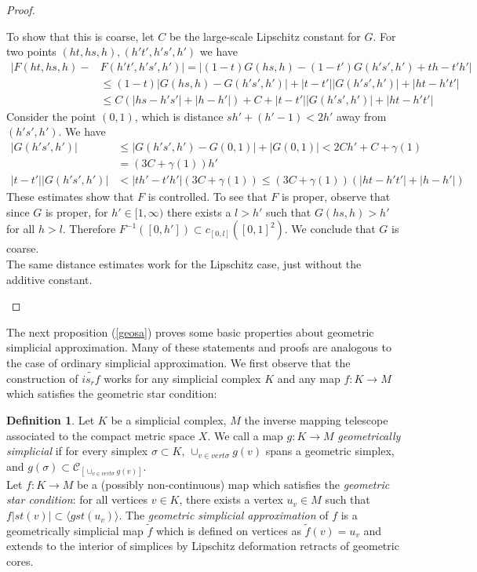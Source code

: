 \documentclass[a4paper,11pt]{article}
\theoremstyle{definition}
\newtheorem{definition}{Definition}[section]
\theoremstyle{plain}
\theoremstyle{remark}
\begin{document}
{\begin{proof}
\begin{enumerate}
To show that this is coarse, let $C$ be the large-scale Lipschitz constant for $G$. For two points $(ht,hs,h), (h't',h's',h')$ we have
\begin{align*}
|F(ht,hs,h)-&F(h't',h's',h')| = |(1-t)G(hs,h) -(1-t')G(h's',h')+ th - t'h'| \\
&\leq (1-t)|G(hs,h) -G(h's',h')| + |t-t'||G(h's',h')| + |ht-h't'|\\
&\leq C(|hs-h's'| + |h-h'|)+C + |t-t'||G(h's',h')| + |ht-h't'|
\end{align*}
Consider the point $(0,1)$, which is distance $sh' + (h'-1) < 2h'$ away from $(h's',h')$. We have
\begin{align*}
|G(h's',h')| &\leq |G(h's',h')-G(0,1)|+ |G(0,1)| < 2Ch' + C + \gamma(1) \\
&= (3C+ \gamma(1))h'\\
|t-t'| |G(h's',h')| &< |th'-t'h'|(3C+ \gamma(1)) \leq (3C+ \gamma(1))( |ht-h't'| + |h-h'|)
\end{align*}
These estimates show that $F$ is controlled. To see that $F$ is proper, observe that since $G$ is proper, for $h'\in [1,\infty)$ there exists a $l>h'$ such that $G(hs,h) > h'$ for all $h>l$. Therefore $F^{-1}([0,h'])\subset c_{[0,l]}([0,1]^2)$. We conclude that $G$ is coarse.\\

The same distance estimates work for the Lipschitz case, just without the additive constant.  
\end{enumerate}
\end{proof}

The next proposition (\ref{geosa}) proves some basic properties about geometric simplicial approximation.  Many of these statements and proofs are analogous to the case of ordinary simplicial approximation. We first observe that the construction of $\widetilde{is_{r}f}$ works for any simplicial complex $K$ and any map $f: K\rightarrow M$ which satisfies the geometric star condition:

\begin{definition} Let $K$ be a simplicial complex, $M$ the inverse mapping telescope associated to the compact metric space $X$. We call a map $g: K\rightarrow M$ \textit{geometrically simplicial} if for every simplex $\sigma \subset K$, $\cup_{v \in vert \sigma} g(v)$ spans a geometric simplex, and $g(\sigma) \subset \mathscr{C}_{ [\cup_{v \in vert \sigma} g(v)]}$. \\

 Let $f: K\rightarrow M$ be a (possibly non-continuous) map which satisfies the \textit{geometric star condition}: for all vertices $v\in K$, there exists a vertex $u_{v}\in M$ such that $f|st(v)|\subset \langle gst(u_{v})\rangle $. The \textit{geometric simplicial approximation} of $f$ is a geometrically simplicial map $\tilde{f}$ which is defined on vertices as $\tilde{f}(v)=u_{v}$ and extends to the interior of simplices by Lipschitz deformation retracts of geometric cores.\\
\end{definition}

}
\end{document}

